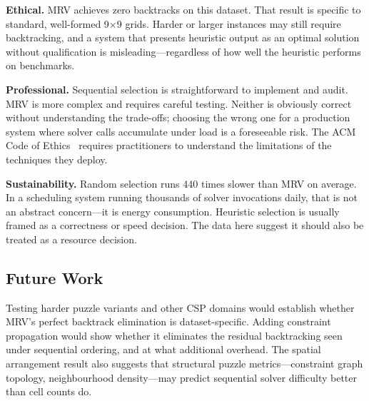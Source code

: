 \documentclass[conference]{IEEEtran}
\begin{document}
\textbf{Ethical.} MRV achieves zero backtracks on this dataset. That result is specific to standard, well-formed 9$\times$9 grids. Harder or larger instances may still require backtracking, and a system that presents heuristic output as an optimal solution without qualification is misleading---regardless of how well the heuristic performs on benchmarks.

\textbf{Professional.} Sequential selection is straightforward to implement and audit. MRV is more complex and requires careful testing. Neither is obviously correct without understanding the trade-offs; choosing the wrong one for a production system where solver calls accumulate under load is a foreseeable risk. The ACM Code of Ethics~\cite{acm2018} requires practitioners to understand the limitations of the techniques they deploy.

\textbf{Sustainability.} Random selection runs 440 times slower than MRV on average. In a scheduling system running thousands of solver invocations daily, that is not an abstract concern---it is energy consumption. Heuristic selection is usually framed as a correctness or speed decision. The data here suggest it should also be treated as a resource decision.

\subsection{Future Work}

Testing harder puzzle variants and other CSP domains would establish whether MRV's perfect backtrack elimination is dataset-specific. Adding constraint propagation would show whether it eliminates the residual backtracking seen under sequential ordering, and at what additional overhead. The spatial arrangement result also suggests that structural puzzle metrics---constraint graph topology, neighbourhood density---may predict sequential solver difficulty better than cell counts do.
\end{document}
